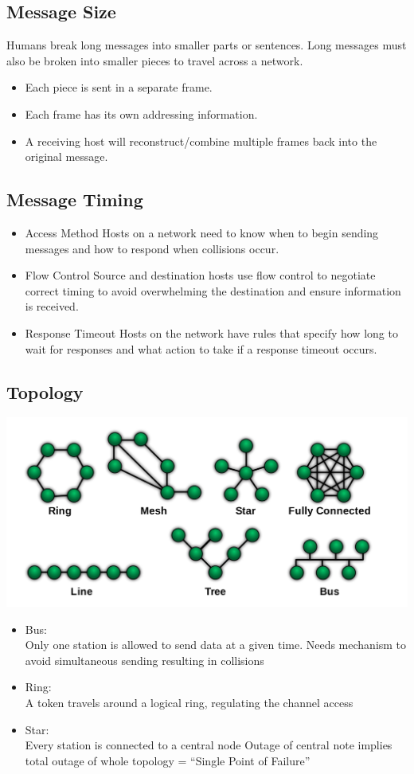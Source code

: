 \documentclass[11pt]{article}
\begin{document}
\subsection{Message Size}
    Humans break long messages into smaller parts or sentences.
    Long messages must also be broken into smaller pieces to travel across a network.
    \begin{itemize}
        \item Each piece is sent in a separate frame.
        \item Each frame has its own addressing information.
        \item A receiving host will reconstruct/combine multiple frames back into the original message.
    \end{itemize}
\subsection{Message Timing}
    \begin{itemize}
        \item Access Method
        Hosts on a network need to know when to begin sending messages and how to respond when collisions occur.
        \item Flow Control
        Source and destination hosts use flow control to negotiate correct timing to avoid overwhelming the destination and ensure information is received.
        \item Response Timeout
        Hosts on the network have rules that specify how long to wait for responses and what action to take if a response timeout occurs.
    \end{itemize}
\subsection{Topology}
    \includegraphics[width=\textwidth]{topology}
    \begin{itemize}
        \item Bus: \\
        Only one station is allowed to send data at a given time.
        Needs mechanism to avoid simultaneous sending resulting in collisions
        \item Ring: \\
        A token travels around a logical ring, regulating the channel access
        \item Star: \\
        Every station is connected to a central node
        Outage of central note implies total outage of whole topology = “Single Point of Failure”
    \end{itemize}
\end{document}
